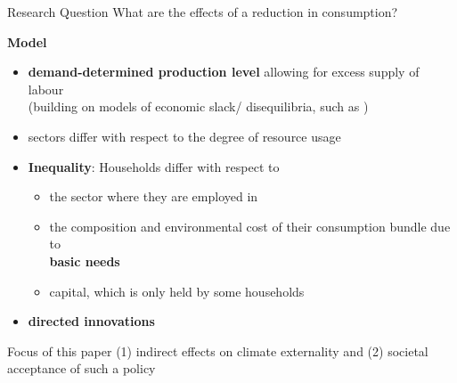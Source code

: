 \documentclass[11pt,aspectratio=169]{beamer}
\begin{document}
\begin{frame}{}
	\vspace{4mm}
		\begin{block}{Research Question}
			What are the effects of a reduction in consumption?%
	\end{block}
%
\pause
\textbf{Model}
\pause
\vspace{-2mm}
	\begin{itemize}[<+-| alert@+>]
		\item \textbf{demand-determined production level} allowing for excess supply of labour \\
		\small{(building on models of economic slack/ disequilibria, such as \cite{Auerbach2021InequalityEconomy})}
		
		\item sectors differ with respect to the degree of resource usage %
		\item \textbf{Inequality}: Households differ with respect to
		\begin{itemize}
	
\item the sector where they are employed in
\item the composition and environmental cost of their consumption bundle due to\\ \textbf{basic needs} 
\item capital, which is only held by some households
		\end{itemize}
	\item \textbf{directed innovations}
	\end{itemize}
\vspace{2mm}
\pause 
\begin{block}{Focus of this paper}
(1) indirect effects on climate externality and (2) societal acceptance of such a policy
\end{block}
\end{frame}
\end{document}

